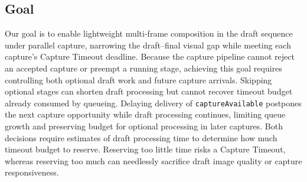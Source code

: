 \subsection{Goal}
\label{sec:research-goal}

Our goal is to enable lightweight multi-frame composition in the draft sequence under parallel capture, narrowing the draft--final visual gap while meeting each capture's Capture Timeout deadline.
Because the capture pipeline cannot reject an accepted capture or preempt a running stage, achieving this goal requires controlling both optional draft work and future capture arrivals.
Skipping optional stages can shorten draft processing but cannot recover timeout budget already consumed by queueing.
Delaying delivery of \texttt{captureAvailable} postpones the next capture opportunity while draft processing continues, limiting queue growth and preserving budget for optional processing in later captures.
Both decisions require estimates of draft processing time to determine how much timeout budget to reserve.
Reserving too little time risks a Capture Timeout, whereas reserving too much can needlessly sacrifice draft image quality or capture responsiveness.
